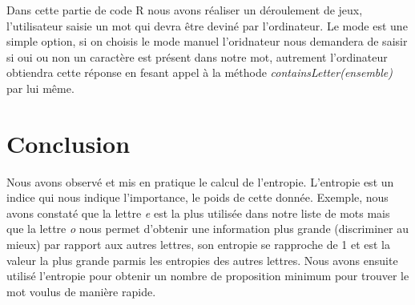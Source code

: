 \documentclass[a4paper,12pt]{report}
\begin{document}
Dans cette partie de code R nous avons réaliser un déroulement de jeux, l'utilisateur saisie un mot qui devra être deviné par l'ordinateur. Le mode est une simple option, si on choisis le mode manuel l'oridnateur nous demandera de saisir si oui ou non un caractère est présent dans notre mot, autrement l'ordinateur obtiendra cette réponse en fesant appel à la méthode \textit{containsLetter(ensemble)} par lui même.

\section*{Conclusion}

Nous avons observé et mis en pratique le calcul de l'entropie. L'entropie est un indice qui nous indique l'importance, le poids de cette donnée. Exemple, nous avons constaté que la lettre \textit{e} est la plus utilisée dans notre liste de mots mais que la lettre \textit{o} nous permet d'obtenir une information plus grande (discriminer au mieux) par rapport aux autres lettres, son entropie se rapproche de 1 et est la valeur la plus grande parmis les entropies des autres lettres. Nous avons ensuite utilisé l'entropie pour obtenir un nombre de proposition minimum pour trouver le mot voulus de manière rapide.
\end{document}
